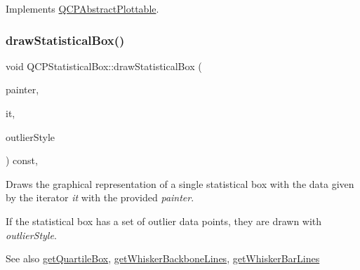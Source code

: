 Implements \mbox{\hyperlink{class_q_c_p_abstract_plottable_a9a450783fd9ed539e589999fd390cdf7}{Q\+C\+P\+Abstract\+Plottable}}.

\mbox{\label{class_q_c_p_statistical_box_a02dc6b561be8203d460d7263da74b8a9}} 
\subsubsection{\texorpdfstring{drawStatisticalBox()}{drawStatisticalBox()}}
{\footnotesize\ttfamily void Q\+C\+P\+Statistical\+Box\+::draw\+Statistical\+Box (\begin{DoxyParamCaption}\item[{\mbox{\hyperlink{class_q_c_p_painter}{Q\+C\+P\+Painter}} $\ast$}]{painter,  }\item[{\mbox{\hyperlink{class_q_c_p_data_container_ae40a91f5cb0bcac61d727427449b7d15}{Q\+C\+P\+Statistical\+Box\+Data\+Container\+::const\+\_\+iterator}}}]{it,  }\item[{const \mbox{\hyperlink{class_q_c_p_scatter_style}{Q\+C\+P\+Scatter\+Style}} \&}]{outlier\+Style }\end{DoxyParamCaption}) const\hspace{0.3cm}{\ttfamily [protected]}, {\ttfamily [virtual]}}

Draws the graphical representation of a single statistical box with the data given by the iterator {\itshape it} with the provided {\itshape painter}.

If the statistical box has a set of outlier data points, they are drawn with {\itshape outlier\+Style}.

\begin{DoxySeeAlso}{See also}
\mbox{\hyperlink{class_q_c_p_statistical_box_aa44482bf991ceca74602294dd9977243}{get\+Quartile\+Box}}, \mbox{\hyperlink{class_q_c_p_statistical_box_a233c28f8c2464ed104a4d580eedd4c64}{get\+Whisker\+Backbone\+Lines}}, \mbox{\hyperlink{class_q_c_p_statistical_box_af478f6e8a5e9ca2f1bbac10a6b73319a}{get\+Whisker\+Bar\+Lines}} 
\end{DoxySeeAlso}
\mbox{\label{class_q_c_p_statistical_box_a77d2d13301dfe60c13adfaa17fc1802f}} 
